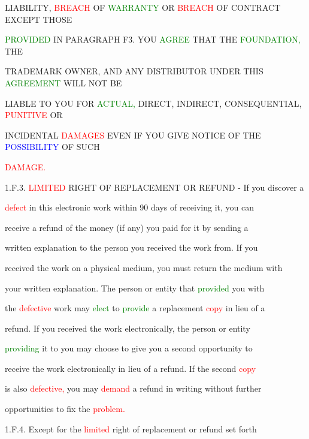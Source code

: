  LIABILITY, \textcolor{red}{BREACH} OF \textcolor{green}{WARRANTY} OR \textcolor{red}{BREACH} OF CONTRACT EXCEPT THOSE

 \textcolor{green}{PROVIDED} IN PARAGRAPH F3. YOU \textcolor{green}{AGREE} THAT THE \textcolor{green}{FOUNDATION,} THE

 TRADEMARK OWNER, AND ANY DISTRIBUTOR UNDER THIS \textcolor{green}{AGREEMENT} WILL NOT BE

 LIABLE TO YOU FOR \textcolor{green}{ACTUAL,} DIRECT, INDIRECT, CONSEQUENTIAL, \textcolor{red}{PUNITIVE} OR

 INCIDENTAL \textcolor{red}{DAMAGES} EVEN IF YOU GIVE NOTICE OF THE \textcolor{blue}{POSSIBILITY} OF SUCH

 \textcolor{red}{DAMAGE.}



 1.F.3. \textcolor{red}{LIMITED} RIGHT OF REPLACEMENT OR REFUND - If you discover a

 \textcolor{red}{defect} in this electronic work within 90 days of receiving it, you can

 receive a refund of the \textcolor{BurntOrange}{money} (if any) you paid for it by sending a

 written explanation to the person you received the work from. If you

 received the work on a physical medium, you must return the medium with

 your written explanation. The person or entity that \textcolor{green}{provided} you with

 the \textcolor{red}{defective} work may \textcolor{green}{elect} to \textcolor{green}{provide} a replacement \textcolor{red}{copy} in lieu of a

 refund. If you received the work electronically, the person or entity

 \textcolor{green}{providing} it to you may choose to give you a second \textcolor{BurntOrange}{opportunity} to

 receive the work electronically in lieu of a refund. If the second \textcolor{red}{copy}

 is also \textcolor{red}{defective,} you may \textcolor{red}{demand} a refund in writing without further

 \textcolor{BurntOrange}{opportunities} to fix the \textcolor{red}{problem.}



 1.F.4. Except for the \textcolor{red}{limited} right of replacement or refund set forth

